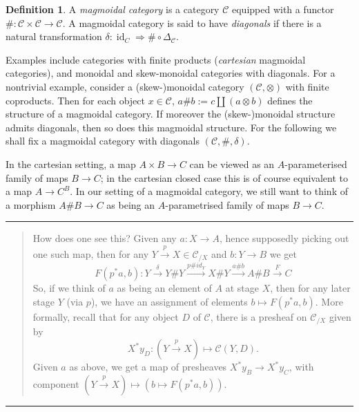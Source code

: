 \documentclass{tufte-handout}
\theoremstyle{definition}
\newtheorem*{definition}{Definition}
\DeclareMathOperator{\id}{id}
\DeclareMathOperator{\Pre}{Pre}
\def\CC{\mathcal{C}}
\begin{document}
\begin{definition}
A \emph{magmoidal category} is a category $\CC$ equipped with a functor $\# \colon \CC\times \CC\to \CC$.
A magmoidal category is said to have \emph{diagonals} if there is a natural transformation $\delta\colon \id_C \Rightarrow \#\circ \Delta_\CC$. 
\end{definition}


Examples include categories with finite products (\emph{cartesian} magmoidal categories), and monoidal and skew-monoidal categories with diagonals.
For a nontrivial example, consider a (skew-)monoidal category $(\mathcal{C},\otimes)$ with finite coproducts. 
Then for each object $x\in \mathcal{C}$, $a\# b := c\amalg (a\otimes b)$ defines the structure of a magmoidal category.
If moreover the (skew-)monoidal structure admits diagonals, then so does this magmoidal structure.
For the following we shall fix a magmoidal category with diagonals $(\CC,\#,\delta)$.


In the cartesian setting, a map $A\times B \to C$ can be viewed as an $A$-parameterised family of maps $B\to C$; in the cartesian closed case this is of course equivalent to a map $A \to C^B$.
In our setting of a magmoidal category, we still want to think of a morphism $A\# B \to C$ as being an $A$-parametrised family of maps $B\to C$.

\medskip

\hrule
\begin{quote}
\small How does one see this? Given any $a\colon X\to A$, hence supposedly picking out one such map, then for any $Y\xrightarrow{p} X \in \mathcal{C}_{/X}$ and $b\colon Y\to B$ we get 
\[
F(p^*a,b)\colon Y\xrightarrow{\delta} Y\# Y \xrightarrow{p\# id_Y} X\# Y \xrightarrow{a\# b} A \# B \xrightarrow{F} C
\] 
So, if we think of $a$ as being an element of $A$ at stage $X$, then for any later stage $Y$ (via $p$), we have an assignment of elements $b\mapsto F(p^*a,b)$.
More formally, recall that for any object $D$ of $\mathcal{C}$, there is a presheaf on $\mathcal{C}_{/X}$ given by 
\[
  X^*y_D\colon (Y\xrightarrow{p} X) \mapsto \mathcal{C}(Y,D).
\] 
Given $a$ as above, we get a map of presheaves $X^*y_B \to X^*y_C$, with component $(Y\xrightarrow{p} X)  \mapsto \left(b\mapsto F(p^*a,b)\right)$.
\end{quote}


\hrule

\medskip
\end{document}
